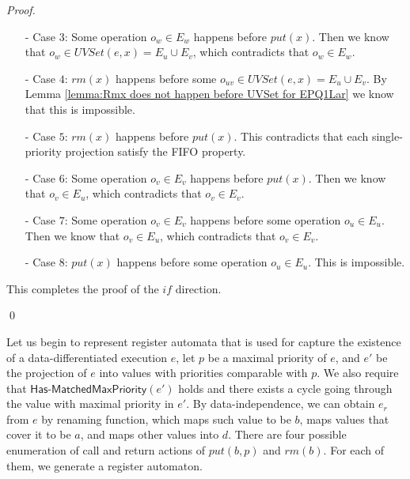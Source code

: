 \begin {proof}
\begin{itemize}
\item[-] Case $3$: Some operation $o_w \in E_w$ happens before $\textit{put}(x)$. Then we know that $o_w \in \textit{UVSet}(e,x) = E_u \cup E_v$, which contradicts that $o_w \in E_w$.

\item[-] Case $4$: $\textit{rm}(x)$ happens before some $o_{\textit{uv}} \in \textit{UVSet}(e,x) = E_u \cup E_v$. By Lemma \ref{lemma:Rmx does not happen before UVSet for EPQ1Lar} we know that this is impossible.

\item[-] Case $5$: $\textit{rm}(x)$ happens before $\textit{put}(x)$. This contradicts that each single-priority projection satisfy the FIFO property.

\item[-] Case $6$: Some operation $o_v \in E_v$ happens before $\textit{put}(x)$. Then we know that $o_v \in E_u$, which contradicts that $o_v \in E_v$.

\item[-] Case $7$: Some operation $o_v \in E_v$ happens before some operation $o_u \in E_u$. Then we know that $o_v \in E_u$, which contradicts that $o_v \in E_v$.

\item[-] Case $8$: $\textit{put}(x)$ happens before some operation $o_u \in E_u$. This is impossible.
\end{itemize}

This completes the proof of the $\textit{if}$ direction.

\qed
\end {proof}


Let us begin to represent register automata that is used for capture the existence of a data-differentiated execution $e$, let $p$ be a maximal priority of $e$, and $e'$ be the projection of $e$ into values with priorities comparable with $p$. We also require that $\mathsf{Has\text{-}MatchedMaxPriority}(e')$ holds and there exists a cycle going through the value with maximal priority in $e'$. By data-independence, we can obtain $e_r$ from $e$ by renaming function, which maps such value to be $b$, maps values that cover it to be $a$, and maps other values into $d$. There are four possible enumeration of call and return actions of $\textit{put}(b,p)$ and $\textit{rm}(b)$. For each of them, we generate a register automaton.

